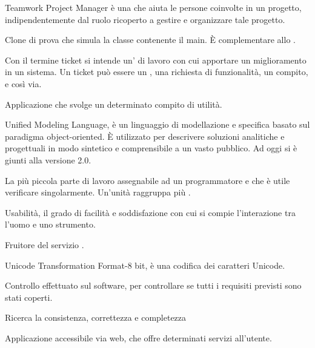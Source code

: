 Teamwork Project Manager è una  che aiuta le persone coinvolte in un progetto, indipendentemente dal ruolo ricoperto a gestire e organizzare tale progetto.

Clone di prova che simula la classe contenente il main. È complementare allo .

Con il termine ticket si intende un' di lavoro con cui apportare un miglioramento in un sistema. Un ticket può essere un , una richiesta di funzionalità, un compito, e così via.

Applicazione che svolge un determinato compito di utilità.


Unified Modeling Language, è un linguaggio di modellazione e specifica basato sul paradigma object-oriented. 
È utilizzato per descrivere soluzioni analitiche e progettuali in modo sintetico e comprensibile a un vasto pubblico.
Ad oggi si è giunti alla versione 2.0.

La più piccola parte di lavoro assegnabile ad un programmatore e che è utile verificare singolarmente. Un'unità raggruppa più .

Usabilità, il grado di facilità e soddisfazione con cui si compie l'interazione tra l'uomo e uno strumento.

Fruitore del servizio \ProjectName{}.

Unicode Transformation Format-8 bit, è una codifica dei caratteri Unicode. 


Controllo effettuato sul software, per controllare se tutti i requisiti previsti sono stati coperti.

Ricerca la consistenza, correttezza e completezza


Applicazione accessibile via web, che offre determinati servizi all'utente.

%



